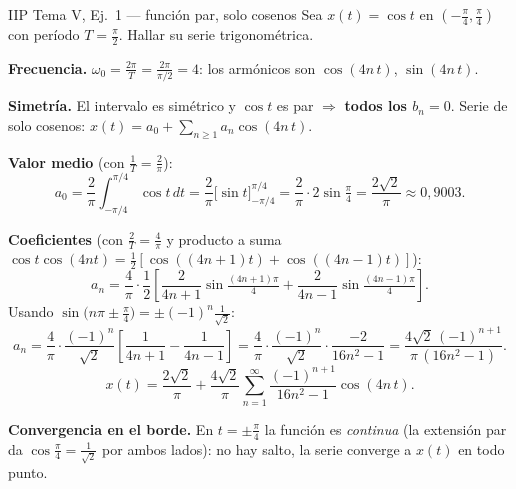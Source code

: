 \begin{ejemplo}{IIP Tema V, Ej.\ 1 — función par, solo cosenos}
Sea $x(t)=\cos t$ en $\left(-\tfrac\pi4,\tfrac\pi4\right)$ con período $T=\tfrac\pi2$. Hallar su serie trigonométrica.

\medskip
\textbf{Frecuencia.} $\omega_0=\frac{2\pi}{T}=\frac{2\pi}{\pi/2}=4$: los armónicos son $\cos(4n\,t)$, $\sin(4n\,t)$.

\textbf{Simetría.} El intervalo es simétrico y $\cos t$ es par $\Rightarrow$ \textbf{todos los $b_n=0$}. Serie de solo cosenos: $x(t)=a_0+\sum_{n\ge1}a_n\cos(4n\,t)$.

\textbf{Valor medio} (con $\frac1T=\frac2\pi$):
\[
a_0=\frac{2}{\pi}\int_{-\pi/4}^{\pi/4}\cos t\,dt=\frac2\pi\big[\sin t\big]_{-\pi/4}^{\pi/4}=\frac2\pi\cdot2\sin\tfrac\pi4=\frac{2\sqrt2}{\pi}\approx0{,}9003.
\]

\textbf{Coeficientes} (con $\frac2T=\frac4\pi$ y producto a suma $\cos t\cos(4nt)=\tfrac12[\cos((4n+1)t)+\cos((4n-1)t)]$):
\[
a_n=\frac4\pi\cdot\frac12\left[\frac{2}{4n+1}\sin\tfrac{(4n+1)\pi}{4}+\frac{2}{4n-1}\sin\tfrac{(4n-1)\pi}{4}\right].
\]
Usando $\sin\!\big(n\pi\pm\tfrac\pi4\big)=\pm(-1)^n\tfrac{1}{\sqrt2}$:
\[
a_n=\frac4\pi\cdot\frac{(-1)^n}{\sqrt2}\left[\frac{1}{4n+1}-\frac{1}{4n-1}\right]
=\frac4\pi\cdot\frac{(-1)^n}{\sqrt2}\cdot\frac{-2}{16n^2-1}
=\frac{4\sqrt2\,(-1)^{n+1}}{\pi\,(16n^2-1)}.
\]
\[
\boxed{\;x(t)=\frac{2\sqrt2}{\pi}+\frac{4\sqrt2}{\pi}\sum_{n=1}^{\infty}\frac{(-1)^{n+1}}{16n^2-1}\cos(4n\,t).\;}
\]

\textbf{Convergencia en el borde.} En $t=\pm\tfrac\pi4$ la función es \emph{continua} (la extensión par da $\cos\tfrac\pi4=\tfrac1{\sqrt2}$ por ambos lados): no hay salto, la serie converge a $x(t)$ en todo punto.
\end{ejemplo}

